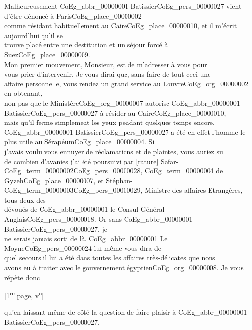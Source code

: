 \documentclass{book}
\begin{document}
\indent Malheureusement \gls{CoEg_abbr_00000001} Batissier\gls{CoEg_pers_00000027} vient d’être dénoncé à Paris\gls{CoEg_place_00000002}\\
comme résidant habituellement au Caire\gls{CoEg_place_00000010}, et il m’écrit aujourd’hui qu’il se\\
trouve placé entre une destitution et un séjour forcé à Suez\gls{CoEg_place_00000009}.\\
\indent Mon premier mouvement, Monsieur, est de m’adresser à vous pour\\
vous prier d’intervenir. Je vous dirai que, sans faire de tout ceci une\\
affaire personnelle, vous rendez un grand service au Louvre\gls{CoEg_org_00000002} en obtenant,\\
non pas que le Ministère\gls{CoEg_org_00000007} autorise \gls{CoEg_abbr_00000001} Batissier\gls{CoEg_pers_00000027} à résider au Caire\gls{CoEg_place_00000010},\\
mais qu’il ferme simplement les yeux pendant quelques temps encore.\\
\gls{CoEg_abbr_00000001} Batissier\gls{CoEg_pers_00000027} a été en effet l’homme le plus utile au Sérapéum\gls{CoEg_place_00000004}. Si\\
j’avais voulu vous ennuyer de réclamations et de plaintes, vous auriez su\\
de combien d’avanies j’ai été poursuivi par [rature] Safar-\Gls{CoEg_term_00000002}\gls{CoEg_pers_00000028}, \gls{CoEg_term_00000004} de\\
Gyzeh\gls{CoEg_place_00000007}, et Stéphan-\gls{CoEg_term_00000003}\gls{CoEg_pers_00000029}, Ministre des affaires Etrangères, tous deux des\\
dévoués de \gls{CoEg_abbr_00000001} le Consul-Général Anglais\gls{CoEg_pers_00000018}. Or sans \gls{CoEg_abbr_00000001} Batissier\gls{CoEg_pers_00000027}, je\\
ne serais jamais sorti de là. \gls{CoEg_abbr_00000001} Le Moyne\gls{CoEg_pers_00000024} lui-même vous dira de\\
quel secours il lui a été dans toutes les affaires très-délicates que nous\\
avons eu à traiter avec le gouvernement égyptien\gls{CoEg_org_00000008}. Je vous répète donc
{\footnotesize \begin{center} [1\textsuperscript{re} page, v\textsuperscript{o}]\end{center}}
\noindent qu’en laissant même de côté la question de faire plaisir à \gls{CoEg_abbr_00000001} Batissier\gls{CoEg_pers_00000027},\\
\end{document}
